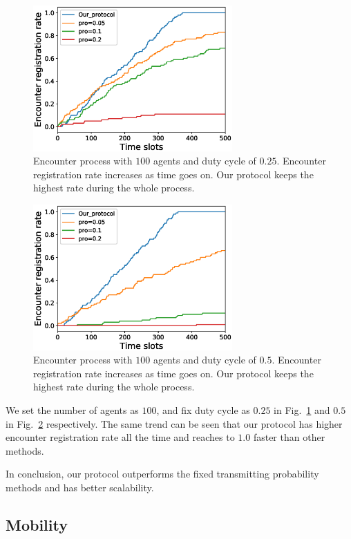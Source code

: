 \begin{figure}[!h]
    \centering
    \includegraphics[width=3in]{figures/figure5.eps}
    \caption{Encounter process with $100$ agents and duty cycle of $0.25$. 
    Encounter registration rate increases as time goes on. Our protocol keeps
    the highest rate during the whole process.}
    \label{fig5}
\end{figure}

\begin{figure}[!h]
    \centering
    \includegraphics[width=3in]{figures/figure6.eps}
    \caption{Encounter process with $100$ agents and duty cycle of $0.5$. 
    Encounter registration rate increases as time goes on. Our protocol keeps
    the highest rate during the whole process.}
    \label{fig6}
\end{figure}



We set the number of agents as $100$, and fix
duty cycle as $0.25$ in Fig.~\ref{fig5} and $0.5$ in Fig.~\ref{fig6} respectively.
The same trend can be seen that our protocol has higher encounter registration rate
all the time and reaches to $1.0$ faster than other methods.

In conclusion, our protocol outperforms the fixed transmitting probability methods 
and has better scalability. 


\subsection{Mobility}

